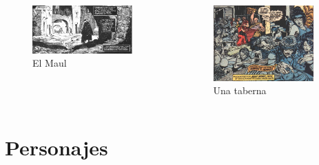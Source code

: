 \begin{frame}{}
	\begin{columns}
		\begin{figure}[htb]
			\centering
			\includegraphics[width=0.9\textwidth]{img/res/01}
			\caption{El Maul}
		\end{figure}
		\begin{figure}[htb]
			\centering
			\includegraphics[width=0.9\textwidth]{img/res/02}
			\caption{Una taberna}
		\end{figure}
	\end{columns}
\end{frame}
\note{

}


\section{Personajes}
\note[itemize]{
	\item
}


